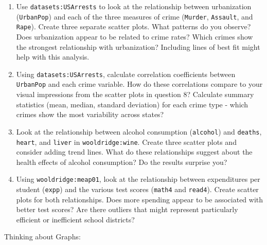 \documentclass[
  letterpaper,
]{book}
\begin{document}
\begin{enumerate}
\def\labelenumi{\arabic{enumi}.}
\setcounter{enumi}{7}
\item
  Use \texttt{datasets:USArrests} to look at the relationship between
  urbanization (\texttt{UrbanPop}) and each of the three measures of
  crime (\texttt{Murder}, \texttt{Assault}, and \texttt{Rape}). Create
  three separate scatter plots. What patterns do you observe? Does
  urbanization appear to be related to crime rates? Which crimes show
  the strongest relationship with urbanization? Including lines of best
  fit might help with this analysis.
\item
  Using \texttt{datasets:USArrests}, calculate correlation coefficients
  between \texttt{UrbanPop} and each crime variable. How do these
  correlations compare to your visual impressions from the scatter plots
  in question 8? Calculate summary statistics (mean, median, standard
  deviation) for each crime type - which crimes show the most
  variability across states?
\item
  Look at the relationship between alcohol consumption
  (\texttt{alcohol}) and \texttt{deaths}, \texttt{heart}, and
  \texttt{liver} in \texttt{wooldridge:wine}. Create three scatter plots
  and consider adding trend lines. What do these relationships suggest
  about the health effects of alcohol consumption? Do the results
  surprise you?
\item
  Using \texttt{wooldridge:meap01}, look at the relationship between
  expenditures per student (\texttt{expp}) and the various test scores
  (\texttt{math4} and \texttt{read4}). Create scatter plots for both
  relationships. Does more spending appear to be associated with better
  test scores? Are there outliers that might represent particularly
  efficient or inefficient school districts?
\end{enumerate}

Thinking about Graphs:
\end{document}
